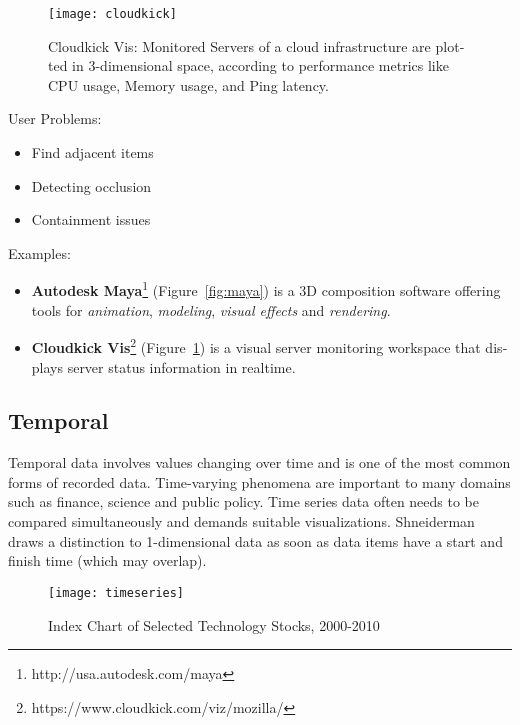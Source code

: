 \begin{english}
\begin{figure}
\centering
\texttt{[image: cloudkick]}
\caption{Cloudkick Vis: Monitored Servers of a cloud infrastructure are plotted in 3-dimensional space, according to performance metrics like CPU usage, Memory usage, and Ping latency.}
\label{fig:cloudkick}
\end{figure}


\SuperPar User Problems:

\begin{itemize}
\item Find adjacent items
\item Detecting occlusion
\item Containment issues
\end{itemize}


\SuperPar Examples:

\begin{itemize}
\item \textbf{Autodesk Maya}\footnote{http://usa.autodesk.com/maya} (Figure~\ref{fig:maya}) is a 3D composition software offering tools for \emph{animation}, \emph{modeling}, \emph{visual effects} and \emph{rendering}.
\item \textbf{Cloudkick Vis}\footnote{https://www.cloudkick.com/viz/mozilla/} (Figure~\ref{fig:cloudkick}) is a visual server monitoring workspace that displays server status information in realtime.
\end{itemize}


\subsection{Temporal}

Temporal data involves values changing over time and is one of the most common forms of recorded data. Time-varying phenomena are important to many domains such as finance, science and public policy. Time series data often needs to be compared simultaneously and demands suitable visualizations. Shneiderman~\cite{shneiderman96eyes} draws a distinction to 1-dimensional data as soon as data items have a start and finish time (which may overlap).


\begin{figure}
\centering
\texttt{[image: timeseries]}
\caption{Index Chart of Selected Technology Stocks, 2000-2010}
\label{fig:timeseries}
\end{figure}


\end{english}
